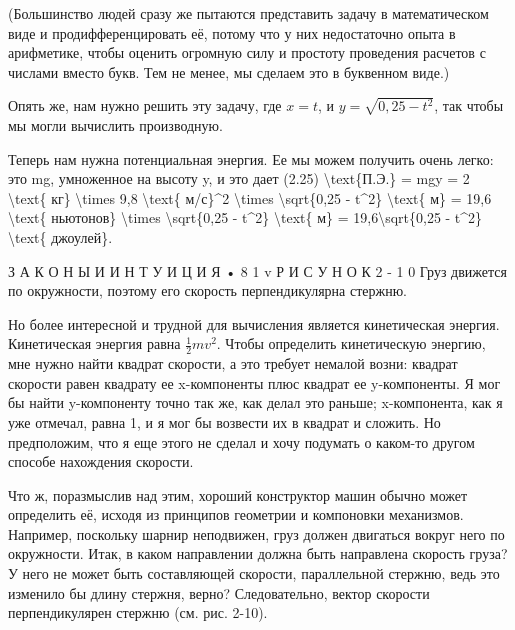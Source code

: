 \documentclass[10pt,oneside]{article}
\begin{document}
(Большинство людей сразу же пытаются представить задачу в математическом виде и продифференцировать её, потому что у них недостаточно опыта в арифметике, чтобы оценить огромную силу и простоту проведения расчетов с числами вместо букв. Тем не менее, мы сделаем это в буквенном виде.)\par

Опять же, нам нужно решить эту задачу, где \(x = t\), и \(y = \sqrt{0,25 - t^2}\), так чтобы мы могли вычислить производную.\par

Теперь нам нужна потенциальная энергия. Ее мы можем получить очень легко: это mg, умноженное на высоту y, и это дает (2.25) \textbackslash{}text\{П.Э.\} = mgy = 2 \textbackslash{}text\{ кг\} \textbackslash{}times 9,8 \textbackslash{}text\{ м/с\}\textasciicircum{}2 \textbackslash{}times \textbackslash{}sqrt\{0,25 - t\textasciicircum{}2\} \textbackslash{}text\{ м\} = 19,6 \textbackslash{}text\{ ньютонов\} \textbackslash{}times \textbackslash{}sqrt\{0,25 - t\textasciicircum{}2\} \textbackslash{}text\{ м\} = 19,6\textbackslash{}sqrt\{0,25 - t\textasciicircum{}2\} \textbackslash{}text\{ джоулей\}.\par

З А К О Н Ы  И  И Н Т У И Ц И Я • 8 1 v Р И С У Н О К  2 - 1 0 Груз движется по окружности, поэтому его скорость перпендикулярна стержню.\par

Но более интересной и трудной для вычисления является кинетическая энергия. Кинетическая энергия равна \(\frac{1}{2} mv^2\). Чтобы определить кинетическую энергию, мне нужно найти квадрат скорости, а это требует немалой возни: квадрат скорости равен квадрату ее x-компоненты плюс квадрат ее y-компоненты. Я мог бы найти y-компоненту точно так же, как делал это раньше; x-компонента, как я уже отмечал, равна 1, и я мог бы возвести их в квадрат и сложить. Но предположим, что я еще этого не сделал и хочу подумать о каком-то другом способе нахождения скорости.\par

Что ж, поразмыслив над этим, хороший конструктор машин обычно может определить её, исходя из принципов геометрии и компоновки механизмов. Например, поскольку шарнир неподвижен, груз должен двигаться вокруг него по окружности. Итак, в каком направлении должна быть направлена скорость груза? У него не может быть составляющей скорости, параллельной стержню, ведь это изменило бы длину стержня, верно? Следовательно, вектор скорости перпендикулярен стержню (см. рис. 2-10).\par
\end{document}
